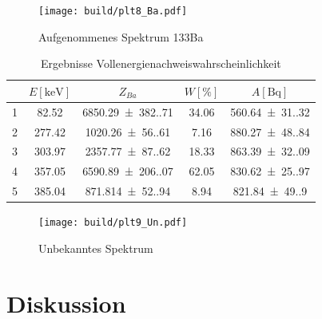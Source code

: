 \begin{figure}[H]
	\centering
	\texttt{[image: build/plt8\_Ba.pdf]}
	\caption{Aufgenommenes Spektrum 133Ba}
	\label{fig:Ba_spektrum}
\end{figure}

\begin{table}[H]
	\centering
	\caption{Ergebnisse Vollenergienachweiswahrscheinlichkeit}
	\begin{tabular}{c c c c c}
		\toprule
		\text{Peak} & $ E [\unit{\kilo\eV}] $ & $ Z_{Ba} $               & $ W [\%] $ & $ A [\unit{\becquerel}] $         \\
		\midrule
		1           & \num{82.52}         & \num{6850.29(382.71)}  & \num{34.06} & \num{560.64(31.32)} \\
		2           & \num{277.42}        & \num{1020.26(56.61)}   & \num{7.16}  & \num{880.27(48.84)} \\
		3           & \num{303.97}        & \num{2357.77(87.62)}   & \num{18.33} & \num{863.39(32.09)} \\
		4           & \num{357.05}        & \num{6590.89(206.07)}  & \num{62.05} & \num{830.62(25.97)} \\
		5           & \num{385.04}        & \num{871.814(52.94)}   & \num{8.94}  & \num{821.84(49.90)} \\
		\bottomrule
	\end{tabular}
	\label{tab:data2}
\end{table}

\begin{figure}
	\centering
	\texttt{[image: build/plt9\_Un.pdf]}
	\caption{Unbekanntes Spektrum}
	\label{fig:Un_spektrum}
\end{figure}


\section{Diskussion}

\newpage
\printbibliography

